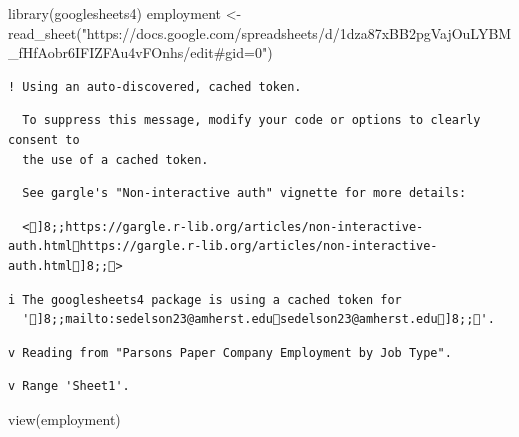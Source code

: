 \documentclass[
  letterpaper,
  DIV=11,
  numbers=noendperiod]{scrartcl}
\newenvironment{Shaded}{\begin{snugshade}}{\end{snugshade}}
\newcommand{\FunctionTok}[1]{\textcolor[rgb]{0.28,0.35,0.67}{#1}}
\newcommand{\NormalTok}[1]{\textcolor[rgb]{0.00,0.23,0.31}{#1}}
\newcommand{\OtherTok}[1]{\textcolor[rgb]{0.00,0.23,0.31}{#1}}
\newcommand{\StringTok}[1]{\textcolor[rgb]{0.13,0.47,0.30}{#1}}
\begin{document}
\begin{Shaded}
\begin{Highlighting}[]
\FunctionTok{library}\NormalTok{(googlesheets4)}
\NormalTok{employment }\OtherTok{\textless{}{-}} \FunctionTok{read\_sheet}\NormalTok{(}\StringTok{"https://docs.google.com/spreadsheets/d/1dza87xBB2pgVajOuLYBM\_fHfAobr6IFIZFAu4vFOnhs/edit\#gid=0"}\NormalTok{)}
\end{Highlighting}
\end{Shaded}

\begin{verbatim}
! Using an auto-discovered, cached token.
\end{verbatim}

\begin{verbatim}
  To suppress this message, modify your code or options to clearly consent to
  the use of a cached token.
\end{verbatim}

\begin{verbatim}
  See gargle's "Non-interactive auth" vignette for more details:
\end{verbatim}

\begin{verbatim}
  <]8;;https://gargle.r-lib.org/articles/non-interactive-auth.htmlhttps://gargle.r-lib.org/articles/non-interactive-auth.html]8;;>
\end{verbatim}

\begin{verbatim}
i The googlesheets4 package is using a cached token for
  ']8;;mailto:sedelson23@amherst.edusedelson23@amherst.edu]8;;'.
\end{verbatim}

\begin{verbatim}
v Reading from "Parsons Paper Company Employment by Job Type".
\end{verbatim}

\begin{verbatim}
v Range 'Sheet1'.
\end{verbatim}

\begin{Shaded}
\begin{Highlighting}[]
\FunctionTok{view}\NormalTok{(employment)}
\end{Highlighting}
\end{Shaded}
\end{document}
